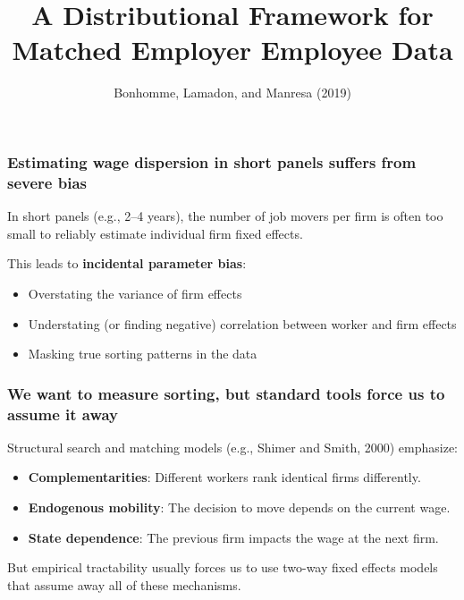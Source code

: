 

\title{A Distributional Framework for Matched Employer Employee Data}
\author{Bonhomme, Lamadon, and Manresa (2019)}
\date{}



\begin{frame}
    \titlepage
\end{frame}

\begin{frame}
    \frametitle{Estimating wage dispersion in short panels suffers from severe bias}
    
    In short panels (e.g., 2--4 years), the number of job movers per firm is often too small to reliably estimate individual firm fixed effects.
    
    \vspace{0.5cm}
    This leads to \textbf{incidental parameter bias}:
    \begin{itemize}
        \item Overstating the variance of firm effects
        \item Understating (or finding negative) correlation between worker and firm effects
        \item Masking true sorting patterns in the data
    \end{itemize}
\end{frame}

\begin{frame}
    \frametitle{We want to measure sorting, but standard tools force us to assume it away}
    
    Structural search and matching models (e.g., Shimer and Smith, 2000) emphasize:
    \begin{itemize}
        \item \textbf{Complementarities}: Different workers rank identical firms differently.
        \item \textbf{Endogenous mobility}: The decision to move depends on the current wage.
        \item \textbf{State dependence}: The previous firm impacts the wage at the next firm.
    \end{itemize}
    
    \vspace{0.5cm}
    But empirical tractability usually forces us to use two-way fixed effects models that assume away all of these mechanisms.
\end{frame}


